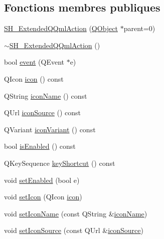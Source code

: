 \subsection*{Fonctions membres publiques}
\begin{DoxyCompactItemize}
\item 
\hyperlink{classSH__ExtendedQQmlAction_aaecd8af53387938e1d1478f7c1c8f566}{S\-H\-\_\-\-Extended\-Q\-Qml\-Action} (\hyperlink{classQObject}{Q\-Object} $\ast$parent=0)
\item 
\hyperlink{classSH__ExtendedQQmlAction_a03c5eae20747d7a8b444c7939d2ab262}{$\sim$\-S\-H\-\_\-\-Extended\-Q\-Qml\-Action} ()
\item 
bool \hyperlink{classSH__ExtendedQQmlAction_a2067689e7c1e14a316ad6095e57d6cf6}{event} (Q\-Event $\ast$e)
\item 
Q\-Icon \hyperlink{classSH__ExtendedQQmlAction_abd41fe1b86e46d46cbf29d22303cd5e4}{icon} () const 
\item 
Q\-String \hyperlink{classSH__ExtendedQQmlAction_afaa301943c53a8689ec5447560ffc97f}{icon\-Name} () const 
\item 
Q\-Url \hyperlink{classSH__ExtendedQQmlAction_a4256635783087124d3df6fa9726e7d55}{icon\-Source} () const 
\item 
Q\-Variant \hyperlink{classSH__ExtendedQQmlAction_a9cfb776ea62b4f0826765adb96b51a0c}{icon\-Variant} () const 
\item 
bool \hyperlink{classSH__ExtendedQQmlAction_a7de35315be948b46e187a38b13629b6e}{is\-Enabled} () const 
\item 
Q\-Key\-Sequence \hyperlink{classSH__ExtendedQQmlAction_a2efb60c1b33a04e8e58ef9184dccbd2d}{key\-Shortcut} () const 
\item 
void \hyperlink{classSH__ExtendedQQmlAction_a29f12b5f71a384d860062ea7b8981aeb}{set\-Enabled} (bool e)
\item 
void \hyperlink{classSH__ExtendedQQmlAction_ab000bcb2ecb4ba9e47834daf5c2e95c3}{set\-Icon} (Q\-Icon \hyperlink{classSH__ExtendedQQmlAction_abd41fe1b86e46d46cbf29d22303cd5e4}{icon})
\item 
void \hyperlink{classSH__ExtendedQQmlAction_abf2bb83a227c27c4d71f1b2670dcb3b4}{set\-Icon\-Name} (const Q\-String \&\hyperlink{classSH__ExtendedQQmlAction_a2f3dba5d2e606c95bd44f77dab1361ea}{icon\-Name})
\item 
void \hyperlink{classSH__ExtendedQQmlAction_a703b29eb866cdc4d739e3f22ada92fb6}{set\-Icon\-Source} (const Q\-Url \&\hyperlink{classSH__ExtendedQQmlAction_abddbad4daf1cac18c608a0e58e93217f}{icon\-Source})
\item 

\end{DoxyCompactItemize}
